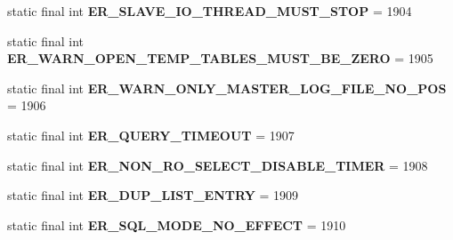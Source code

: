 \begin{DoxyCompactItemize}
\item 
\mbox{\label{classcom_1_1mysql_1_1jdbc_1_1_mysql_error_numbers_a0a037f38b809ae8316aa5946d63e069b}} 
static final int {\bfseries E\+R\+\_\+\+S\+L\+A\+V\+E\+\_\+\+I\+O\+\_\+\+T\+H\+R\+E\+A\+D\+\_\+\+M\+U\+S\+T\+\_\+\+S\+T\+OP} = 1904
\item 
\mbox{\label{classcom_1_1mysql_1_1jdbc_1_1_mysql_error_numbers_ac9b571dfb87f2c168e53f38eeb82d494}} 
static final int {\bfseries E\+R\+\_\+\+W\+A\+R\+N\+\_\+\+O\+P\+E\+N\+\_\+\+T\+E\+M\+P\+\_\+\+T\+A\+B\+L\+E\+S\+\_\+\+M\+U\+S\+T\+\_\+\+B\+E\+\_\+\+Z\+E\+RO} = 1905
\item 
\mbox{\label{classcom_1_1mysql_1_1jdbc_1_1_mysql_error_numbers_ac35368e4d604c35481c04a7054b70898}} 
static final int {\bfseries E\+R\+\_\+\+W\+A\+R\+N\+\_\+\+O\+N\+L\+Y\+\_\+\+M\+A\+S\+T\+E\+R\+\_\+\+L\+O\+G\+\_\+\+F\+I\+L\+E\+\_\+\+N\+O\+\_\+\+P\+OS} = 1906
\item 
\mbox{\label{classcom_1_1mysql_1_1jdbc_1_1_mysql_error_numbers_a57d858f77f0db4efb96af416913c6ec4}} 
static final int {\bfseries E\+R\+\_\+\+Q\+U\+E\+R\+Y\+\_\+\+T\+I\+M\+E\+O\+UT} = 1907
\item 
\mbox{\label{classcom_1_1mysql_1_1jdbc_1_1_mysql_error_numbers_a6c48bf5bec1e1f9951bf8347b8fa2eb4}} 
static final int {\bfseries E\+R\+\_\+\+N\+O\+N\+\_\+\+R\+O\+\_\+\+S\+E\+L\+E\+C\+T\+\_\+\+D\+I\+S\+A\+B\+L\+E\+\_\+\+T\+I\+M\+ER} = 1908
\item 
\mbox{\label{classcom_1_1mysql_1_1jdbc_1_1_mysql_error_numbers_ac2a888564fa20ee68012a660f7776702}} 
static final int {\bfseries E\+R\+\_\+\+D\+U\+P\+\_\+\+L\+I\+S\+T\+\_\+\+E\+N\+T\+RY} = 1909
\item 
\mbox{\label{classcom_1_1mysql_1_1jdbc_1_1_mysql_error_numbers_a6011a317c018cc2d075c310df9b6a256}} 
static final int {\bfseries E\+R\+\_\+\+S\+Q\+L\+\_\+\+M\+O\+D\+E\+\_\+\+N\+O\+\_\+\+E\+F\+F\+E\+CT} = 1910
\item 

\end{DoxyCompactItemize}
